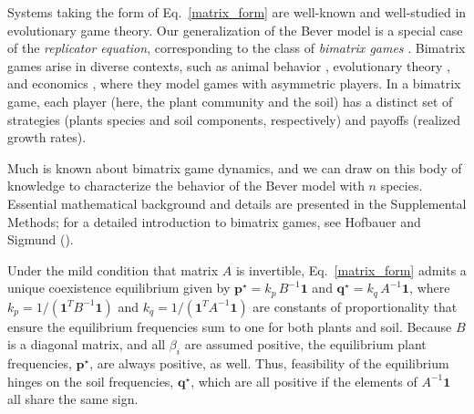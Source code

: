 \documentclass[11pt]{article}
\begin{document}
Systems taking the form of Eq.~\ref{matrix_form} are well-known and well-studied in evolutionary game theory. Our generalization of the Bever model is a special case of the \emph{replicator equation}, corresponding to the class of \emph{bimatrix games} \cite{taylor1979evolutionarily,hofbauer1996evolutionary,hofbauer1998evolutionary,cressman2014replicator}. Bimatrix games arise in diverse contexts, such as animal behavior \cite{taylor1979evolutionarily,selten1988note}, evolutionary theory \cite{hofbauer1998evolutionary,cressman2014replicator}, and economics \cite{friedman1991evolutionary}, where they model games with asymmetric players. In a bimatrix game, each player (here, the plant community and the soil) has a distinct set of strategies (plants species and soil components, respectively) and payoffs (realized growth rates).

Much is known about bimatrix game dynamics, and we can draw on this body of knowledge to characterize the behavior of the Bever model with $n$ species. Essential mathematical background and details are presented in the Supplemental Methods; for a detailed introduction to bimatrix games, see Hofbauer and Sigmund (\cite{hofbauer1998evolutionary}).

Under the mild condition that matrix $A$ is invertible, Eq.~\ref{matrix_form} admits a unique coexistence equilibrium given by $\bm{p}^\star = k_p \, B^{-1} \bm{1}$ and $\bm{q}^\star = k_q \, A^{-1} \bm{1}$, where $k_p = 1 / (\bm{1}^T B^{-1} \bm{1})$ and $k_q = 1 / (\bm{1}^T A^{-1} \bm{1})$ are constants of proportionality that ensure the equilibrium frequencies sum to one for both plants and soil. Because $B$ is a diagonal matrix, and all $\beta_i$ are assumed positive, the equilibrium plant frequencies, $\bm{p}^\star$, are always positive, as well. Thus, feasibility of the equilibrium hinges on the soil frequencies, $\bm{q}^\star$, which are all positive if the elements of $A^{-1} \bm{1}$ all share the same sign.
\end{document}

